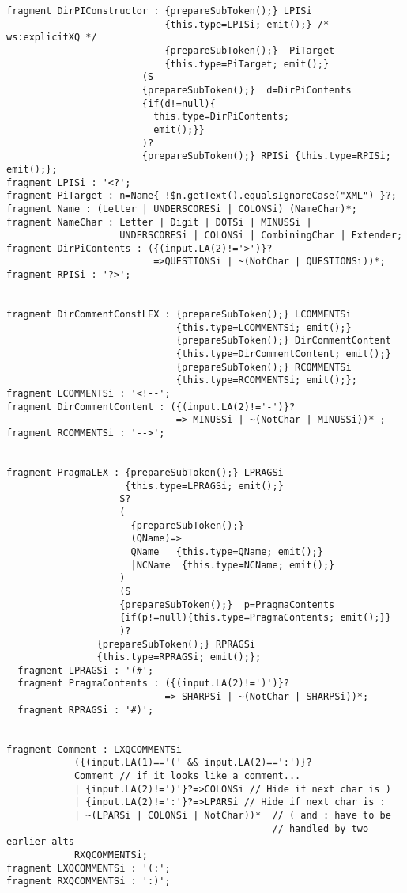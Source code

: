 \begin{Verbatim}[frame=none, fontsize=\footnotesize]
fragment DirPIConstructor : {prepareSubToken();} LPISi
                            {this.type=LPISi; emit();} /* ws:explicitXQ */
                            {prepareSubToken();}  PiTarget 
                            {this.type=PiTarget; emit();}
                        (S 
                        {prepareSubToken();}  d=DirPiContents  
                        {if(d!=null){
                          this.type=DirPiContents; 
                          emit();}} 
                        )?
                        {prepareSubToken();} RPISi {this.type=RPISi; emit();};
fragment LPISi : '<?';
fragment PiTarget : n=Name{ !$n.getText().equalsIgnoreCase("XML") }?;
fragment Name : (Letter | UNDERSCORESi | COLONSi) (NameChar)*;
fragment NameChar : Letter | Digit | DOTSi | MINUSSi | 
                    UNDERSCORESi | COLONSi | CombiningChar | Extender;
fragment DirPiContents : ({(input.LA(2)!='>')}?
                          =>QUESTIONSi | ~(NotChar | QUESTIONSi))*;
fragment RPISi : '?>';


fragment DirCommentConstLEX : {prepareSubToken();} LCOMMENTSi
                              {this.type=LCOMMENTSi; emit();}
                              {prepareSubToken();} DirCommentContent
                              {this.type=DirCommentContent; emit();}
                              {prepareSubToken();} RCOMMENTSi
                              {this.type=RCOMMENTSi; emit();};
fragment LCOMMENTSi : '<!--';
fragment DirCommentContent : ({(input.LA(2)!='-')}?
                              => MINUSSi | ~(NotChar | MINUSSi))* ;
fragment RCOMMENTSi : '-->';


fragment PragmaLEX : {prepareSubToken();} LPRAGSi
                     {this.type=LPRAGSi; emit();} 
                    S? 
                    (
                      {prepareSubToken();}
                      (QName)=> 
                      QName   {this.type=QName; emit();}
                      |NCName  {this.type=NCName; emit();}
                    )
                    (S 
                    {prepareSubToken();}  p=PragmaContents  
                    {if(p!=null){this.type=PragmaContents; emit();}}
                    )? 
                {prepareSubToken();} RPRAGSi
                {this.type=RPRAGSi; emit();}; 
  fragment LPRAGSi : '(#';                      
  fragment PragmaContents : ({(input.LA(2)!=')')}?
                            => SHARPSi | ~(NotChar | SHARPSi))*;
  fragment RPRAGSi : '#)';


fragment Comment : LXQCOMMENTSi 
            ({(input.LA(1)=='(' && input.LA(2)==':')}?
            Comment // if it looks like a comment...
            | {input.LA(2)!=')'}?=>COLONSi // Hide if next char is )
            | {input.LA(2)!=':'}?=>LPARSi // Hide if next char is :
            | ~(LPARSi | COLONSi | NotChar))*  // ( and : have to be 
                                               // handled by two earlier alts
            RXQCOMMENTSi;
fragment LXQCOMMENTSi : '(:';
fragment RXQCOMMENTSi : ':)';


\end{Verbatim}
